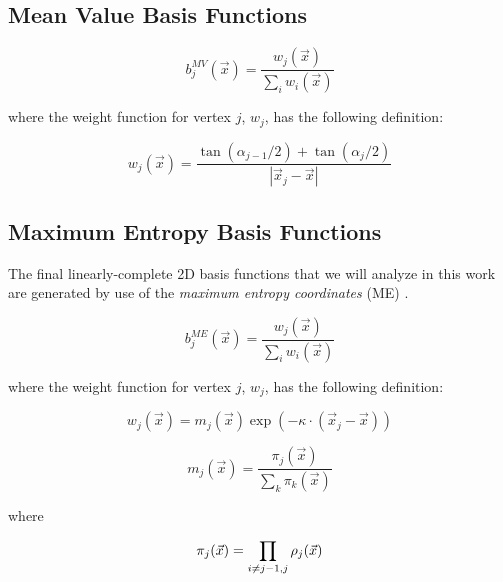 \subsection{Mean Value Basis Functions}
\label{sec::BF_2DLinear_MV}

\begin{equation}
\label{eq::BF_MV_BF}
b_{j}^{MV} (\vec{x}) = \frac{w_j (\vec{x}) }{\sum_i w_i (\vec{x})}
\end{equation}

\noindent where the weight function for vertex $j$, $w_j$, has the following definition:

\begin{equation}
\label{eq::BF_MV_weights}
w_j (\vec{x})  = \frac{\tan(\alpha_{j-1} / 2) + \tan(\alpha_j / 2)}{|\vec{x}_j - \vec{x}|}
\end{equation}

\subsection{Maximum Entropy Basis Functions}
\label{sec::BF_2DLinear_ME}

The final linearly-complete 2D basis functions that we will analyze in this work are generated by use of the {\em maximum entropy coordinates} (ME) \cite{sukumar2004construction,hormann2008maximum}. 

\begin{equation}
\label{eq::BF_ME_BF}
b_{j}^{ME} (\vec{x}) = \frac{w_j (\vec{x}) }{\sum_i w_i (\vec{x})}
\end{equation}

\noindent where the weight function for vertex $j$, $w_j$, has the following definition:

\begin{equation}
\label{eq::BF_ME_weights}
w_j (\vec{x})  = m_j(\vec{x}) \exp(-  \kappa \cdot (\vec{x}_j - \vec{x}))
\end{equation}

\begin{equation}
\label{eq::BF_ME_prior_funcs}
 m_j(\vec{x}) = \frac{\pi_j (\vec{x}) }{\sum_{k} \pi_k (\vec{x})}
\end{equation}

\noindent where

\begin{equation}
\label{eq::BF_ME_prior_products}
\pi_j (\vec{x}) = \prod\displaylimits_{i \neq j-1, j} \rho_j (\vec{x})
\end{equation}


